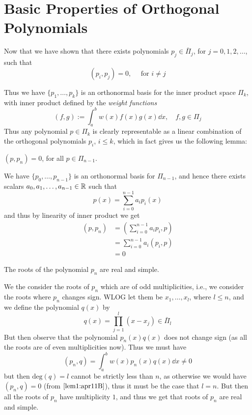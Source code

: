 
\section{Basic Properties of Orthogonal Polynomials}
Now that we have shown that there exists polynomials $p_j \in \bar{\Pi}_j$, for $j = 0,1,2,\dots$, such that 
\[
    (p_i,p_j) = 0, \quad \mbox{ for } i \neq j
\]   

Thus we have $\{p_1, \dots, p_k\}$ is an orthonormal basis for the inner product space $\Pi_k$, with inner product defined by the \textit{weight functions} 
\[
    (f,g) := \int_a^b w(x) f(x) g(x) \dd{x}, \quad f,g \in \Pi_j
\]  
Thus any polynomial $p \in \Pi_k$ is clearly representable as a linear combination of the orthogonal polynomials $p_i$, $i \leq k$, which in fact gives us the following lemma: 

\begin{lem}\label{lem1:apr11B}
    $(p,p_n) = 0$, for all $p \in \Pi_{n-1}$.
\end{lem}
\begin{prf}
    We have $\{p_0,\dots,p_{n-1}\}$ is an orthonormal basis for $\Pi_{n-1}$, and hence there exists scalars $a_0, a_1, \dots, a_{n-1} \in \mathbb{R}$ such that 
    \[
        p(x) = \sum_{i=0}^{n-1} a_i p_i(x)  
    \]
    and thus by linearity of inner product we get 
    \begin{align*}
        (p,p_n) &= \left( \sum_{i=0}^{n-1} a_i p_i, p \right) \\ 
        &= \sum_{i=0}^{n-1} a_i (p_i , p) \\ 
        &= 0
    \end{align*}
\end{prf}

\begin{thm}\label{thm1:apr11B}
    The roots of the polynomial $p_n$ are real and simple.
\end{thm}

\begin{prf}
    We the consider the roots of $p_n$ which are of odd multiplicities, i.e., we consider the roots where $p_n$ changes sign. WLOG let them be $x_1, \dots, x_l$, where $l \leq n$, and we define the polynomial $q(x)$ by 
    \begin{equation}\label{eq1:apr11B}
        q(x) = \prod_{j=1}^l (x-x_j) \in \bar{\Pi}_l
    \end{equation}
    But then observe that the polynomial $p_n(x)q(x)$ does not change sign (as all the roots are of even multiplicities now). Thus we must have 
    \[
        (p_n,q) = \int_a^b w(x) p_n(x) q(x) \dd{x} \neq 0  
    \]
    but then $\mbox{deg}(q) = l$ cannot be strictly less than $n$, as otherwise we would have $(p_n, q) = 0$ (from  $\ref{lem1:apr11B}$), thus it must be the case that $l = n$. But then all the roots of $p_n$ have multiplicity $1$, and thus we get that roots of $p_n$ are real and simple.
\end{prf}

